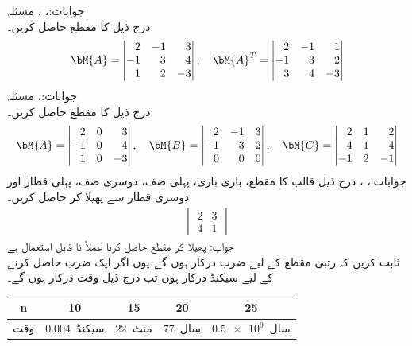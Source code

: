 جوابات:، ، 
\quad مسئلہ \\
درج ذیل کا مقطع حاصل کریں۔
\begin{align*}
\bM{A}=\begin{vmatrix*}[r] 2&-1&3\\-1&3&4\\1&2&-3 \end{vmatrix*}, \quad \bM{A}^T=\begin{vmatrix*}[r] 2&-1&1\\-1&3&2\\3&4&-3 \end{vmatrix*}
\end{align*}
جوابات:، 
\quad مسئلہ \\
درج ذیل کا مقطع حاصل کریں۔
\begin{align*}
\bM{A}=\begin{vmatrix*}[r] 2&0&3\\-1&0&4\\1&0&-3 \end{vmatrix*}, \quad \bM{B}=\begin{vmatrix*}[r] 2&-1&3\\-1&3&2\\0&0&0 \end{vmatrix*},\quad \bM{C}=\begin{vmatrix*}[r] 2&1&2\\4&1&4\\-1&2&-1 \end{vmatrix*}
\end{align*}
جوابات:، ، 
درج ذیل قالب کا مقطع، باری باری، پہلی صف، دوسری صف، پہلی قطار اور دوسری قطار سے پھیلا کر حاصل کریں۔
\begin{align*}
\begin{vmatrix}
2&3\\4&1
\end{vmatrix}
\end{align*}
جواب: 
\quad پھیلا کر مقطع حاصل کرنا عملاً نا قابل استعمال ہے\\
ثابت کریں کہ   رتبی مقطع کے لیے  ضرب درکار ہوں گے۔یوں اگر ایک ضرب حاصل کرنے کے لیے  سیکنڈ درکار ہوں تب درج ذیل وقت درکار ہوں گے۔
\begin{table}[h!]
\centering
\begin{tabular}{ccccc}
n&10&15&20&25\\
\hline
وقت& $0.004$\, سیکنڈ & $22$\, منٹ & $77$ \,سال & $\num{0.5e9}$ \,سال 
\end{tabular}
\end{table} 

